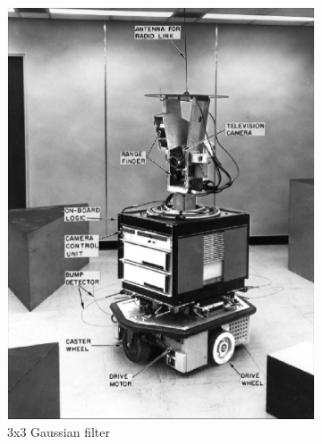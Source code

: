 \documentclass[lettersize,journal]{IEEEtran}
\begin{document}
\begin{figure}[h]
    \centering 
     
    \begin{subfigure}[h]{0.23\textwidth}
        \centering 
        \includegraphics[width=\linewidth]{gaussian_3x3_map}
        \caption{3x3 Gaussian filter}  
    \end{subfigure}
    \begin{subfigure}[h]{0.23\textwidth}
        \centering

\end{subfigure}
\end{figure}
\end{document}
